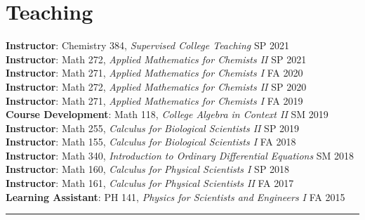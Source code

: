 \documentclass[12pt]{article} %
\begin{document}
\section{Teaching}
\begin{flushleft}
\textbf{Instructor}: Chemistry 384, \emph{Supervised College Teaching} \hfill SP 2021\\
\vspace*{5pt}
\textbf{Instructor}: Math 272, \emph{Applied Mathematics for Chemists II} \hfill SP 2021\\
\vspace*{5pt}
\textbf{Instructor}: Math 271, \emph{Applied Mathematics for Chemists I} \hfill FA 2020\\
\vspace*{5pt}
\textbf{Instructor}: Math 272, \emph{Applied Mathematics for Chemists II} \hfill SP 2020\\
\vspace*{5pt}
\textbf{Instructor}: Math 271, \emph{Applied Mathematics for Chemists I} \hfill FA 2019\\
\vspace*{5pt}
\textbf{Course Development}: Math 118, \emph{College Algebra in Context II} \hfill SM 2019\\
\vspace*{5pt}
\textbf{Instructor}: Math 255, \emph{Calculus for Biological Scientists II} \hfill SP 2019\\
\vspace*{5pt}
\textbf{Instructor}: Math 155, \emph{Calculus for Biological Scientists I} \hfill FA 2018\\
\vspace*{5pt}
\textbf{Instructor}: Math 340, \emph{Introduction to Ordinary Differential Equations} \hfill SM 2018\\
\vspace*{5pt}
\textbf{Instructor}: Math 160, \emph{Calculus for Physical Scientists I} \hfill SP 2018\\
\vspace*{5pt}
\textbf{Instructor}: Math 161, \emph{Calculus for Physical Scientists II} \hfill FA 2017\\
\vspace*{5pt}
\textbf{Learning Assistant}: PH 141, \emph{Physics for Scientists and Engineers I} \hfill FA 2015
\end{flushleft}
\rule{\textwidth}{0.5mm}

\end{document}
